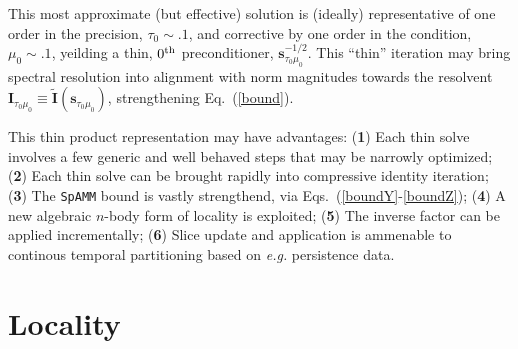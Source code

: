 \documentclass[letterpaper,twocolumn,amsmath,amsfont,amssymb,english,aps,jcp,preprintnumbers,groupaddress,nofootinbib,tightenlines,floatfix]{revtex4}
\newcommand{\mat}[1]{\boldsymbol{#1}}
\theoremstyle{plain}
\theoremstyle{remark}
\theoremstyle{plain}
\begin{document}
This most approximate (but effective) solution is (ideally) representative 
of one order in the precision, $\tau_0\sim .1$, and corrective by one order in the condition, $\mu_0\sim .1$,
yeilding a thin, $0^{\rm th}$ preconditioner, $\mat{s}^{-1/2}_{\tau_0 \mu_0}$.  
This ``thin'' iteration may bring spectral resolution into alignment with norm magnitudes 
towards the resolvent $\mat{I}_{\tau_0\mu_0}\equiv \widetilde{\mat{I}}\left(\mat{s}_{\tau_0\mu_0}\right)$,
strengthening Eq.~(\ref{bound}).



This thin product representation may have advantages: 
({\bf{1}}) Each thin solve involves a few generic and well behaved steps that may be narrowly optimized;
({\bf{2}}) Each thin solve can be brought rapidly into compressive identity iteration; 
({\bf{3}}) The {\tt SpAMM} bound is vastly strengthend, via Eqs.~(\ref{boundY}-\ref{boundZ}); 
({\bf{4}}) A new algebraic $n$-body form of locality is exploited; 
({\bf{5}}) The inverse factor can be applied incrementally;
({\bf{6}}) Slice update and application is ammenable to continous temporal partitioning based on {\em e.g.} persistence data.



\section{Locality} 
\end{document}
